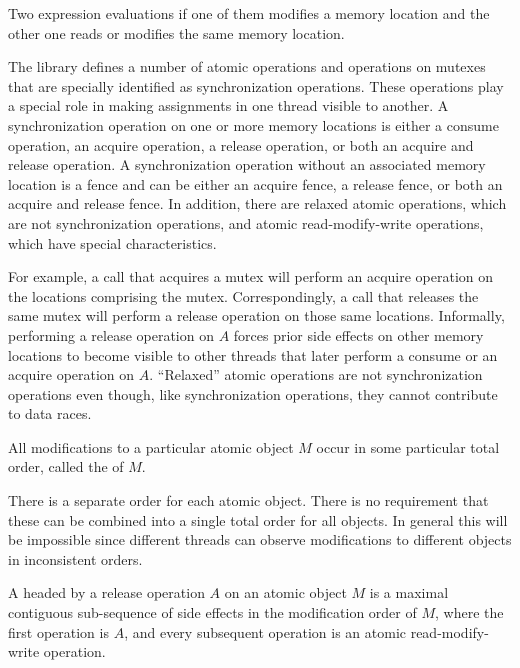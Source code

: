 \pnum
Two expression evaluations  if one of them modifies a memory
location and the other one reads or modifies the same
memory location.

\pnum
The library defines a number of atomic operations and
operations on mutexes that are specially identified as
synchronization operations. These operations play a special role in making
assignments in one thread visible to another. A synchronization operation on one
or more memory locations is either a consume operation, an acquire operation, a
release operation, or both an acquire and release operation. A synchronization
operation without an associated memory location is a fence and can be either an
acquire fence, a release fence, or both an acquire and release fence. In
addition, there are relaxed atomic operations, which are not synchronization
operations, and atomic read-modify-write operations, which have special
characteristics.
\begin{note}
For example, a call that acquires a mutex will
perform an acquire operation on the locations comprising the mutex.
Correspondingly, a call that releases the same mutex will perform a release
operation on those same locations. Informally, performing a release operation on
$A$ forces prior
%
side effects on other memory locations to become visible
to other threads that later perform a consume or an acquire operation on
$A$. ``Relaxed'' atomic operations are not synchronization operations even
though, like synchronization operations, they cannot contribute to data races.
\end{note}

\pnum
All modifications to a particular atomic object $M$ occur in some
particular total order, called the  of $M$.
\begin{note}
There is a separate order for each
atomic object. There is no requirement that these can be combined into a single
total order for all objects. In general this will be impossible since different
threads can observe modifications to different objects in inconsistent orders.
\end{note}

\pnum
A  headed
by a release operation $A$ on an atomic object $M$
is a maximal contiguous sub-sequence of
%
side effects in the modification order of $M$,
where the first operation is $A$, and
every subsequent operation is an atomic read-modify-write operation.

